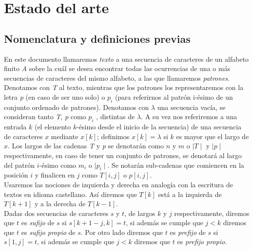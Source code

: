 
\chapter{Estado del arte} %

\label{Chapter1} %

\section{Nomenclatura y definiciones previas}
En este documento llamaremos \emph{texto} a una secuencia de caracteres de un alfabeto finito {\it A} sobre la cuál se desea encontrar todas las ocurrencias de una o más secuencias de caracteres del mismo alfabeto, a las que llamaremos \emph{patrones}. Denotamos con {\it T} al texto, mientras que los patrones los representaremos con la letra {\it p} (en caso de ser uno solo) o $p_{i}$ (para referirnos al patrón i-ésimo de un conjunto ordenado de patrones). Denotamos con $\lambda$ una secuencia vacía, 
se consideran tanto {\it T}, {\it p} como $p_{i}$ , distintas de $\lambda$. A su vez nos referiremos a una entrada $k$ (el elemento $k$-ésimo desde el inicio de la secuencia) de una secuencia de caracteres $x$ mediante $x[k]$; definimos $x[k]=\lambda$ si $k$ es mayor que el largo de $x$. Los largos de las cadenas {\it T} y {\it p} se denotarán como $n$ y $m$ o $\mid T \mid$ y $\mid p \mid$ respectivamente, en caso de tener un conjunto de patrones, se denotará al largo del patrón $i$-ésimo como $m_{i}$ o $\mid p_{i} \mid$. Se notarán sub-cadenas que comiencen en la posición $i$ y finalicen en $j$ como $T[i,j]$ o $p[i,j]$.\\
Usaremos las nociones de izquierda y derecha en analogía con la escritura de textos en idioma castellano. Así diremos que $T[k]$ está a la izquierda de $T[k+1]$ y a la derecha de $T[k-1]$.\\
Dadas dos secuencias de caracteres $s$ y $t$, de largos $k$ y $j$ respectivamente, diremos que $t$ es \emph{sufijo} de $s$ si $s[k + 1 -j,k]=t$, si además se cumple que $j<k$ diremos que $t$ es \emph{sufijo propio} de $s$. Por otro lado diremos que $t$ es \emph{prefijo} de $s$ si $s[1,j]=t$, si además se cumple que $j<k$ diremos que $t$ es \emph{prefijo propio}.
